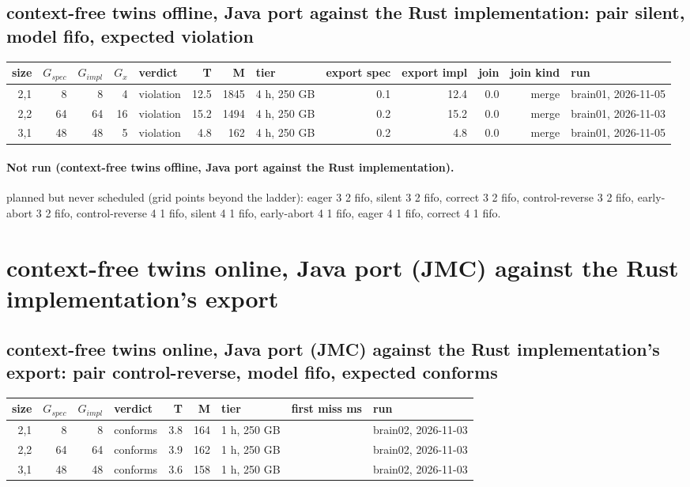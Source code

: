 \documentclass[10pt]{article}
\begin{document}
\subsection*{context-free twins offline, Java port against the Rust implementation: pair \textsf{silent}, model fifo, expected violation}
\begin{longtable}{@{}rrrrlrrlrrrrl@{}}
\toprule
size & $G_{\mathit{spec}}$ & $G_{\mathit{impl}}$ & $G_x$ & verdict & T & M & tier & export spec & export impl & join & join kind & run \\
\midrule
\endhead
\color{blue} 2,1 & 8 & 8 & 4 & violation & 12.5 & 1845 & 4 h, 250 GB & 0.1 & 12.4 & 0.0 & merge & brain01, 2026-11-05 \\
\color{blue} 2,2 & 64 & 64 & 16 & violation & 15.2 & 1494 & 4 h, 250 GB & 0.2 & 15.2 & 0.0 & merge & brain01, 2026-11-03 \\
\color{blue} 3,1 & 48 & 48 & 5 & violation & 4.8 & 162 & 4 h, 250 GB & 0.2 & 4.8 & 0.0 & merge & brain01, 2026-11-05 \\
\bottomrule
\end{longtable}
\paragraph{Not run (context-free twins offline, Java port against the Rust implementation).}
planned but never scheduled (grid points beyond the ladder): eager 3 2 fifo, silent 3 2 fifo, correct 3 2 fifo, control-reverse 3 2 fifo, early-abort 3 2 fifo, control-reverse 4 1 fifo, silent 4 1 fifo, early-abort 4 1 fifo, eager 4 1 fifo, correct 4 1 fifo.\par
\section*{context-free twins online, Java port (JMC) against the Rust implementation's export}
\subsection*{context-free twins online, Java port (JMC) against the Rust implementation's export: pair \textsf{control-reverse}, model fifo, expected conforms}
\begin{longtable}{@{}rrrlrrlrl@{}}
\toprule
size & $G_{\mathit{spec}}$ & $G_{\mathit{impl}}$ & verdict & T & M & tier & first miss ms & run \\
\midrule
\endhead
\color{red} 2,1 & 8 & 8 & conforms & 3.8 & 164 & 1 h, 250 GB &  & brain02, 2026-11-03 \\
\color{red} 2,2 & 64 & 64 & conforms & 3.9 & 162 & 1 h, 250 GB &  & brain02, 2026-11-03 \\
\color{red} 3,1 & 48 & 48 & conforms & 3.6 & 158 & 1 h, 250 GB &  & brain02, 2026-11-03 \\
\bottomrule
\end{longtable}
\end{document}
